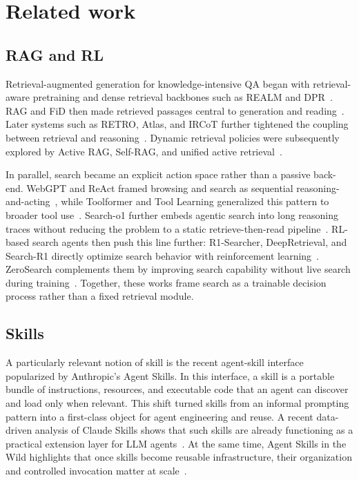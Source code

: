 \documentclass{article}
\begin{document}
\section{Related work}
\subsection{RAG and RL}
Retrieval-augmented generation for knowledge-intensive QA began with retrieval-aware pretraining and dense retrieval backbones such as REALM and DPR~\citep{guu2020realm,karpukhin2020dpr}. RAG and FiD then made retrieved passages central to generation and reading~\citep{lewis2021rag,izacard2021fid}. Later systems such as RETRO, Atlas, and IRCoT further tightened the coupling between retrieval and reasoning~\citep{borgeaud2022retro,izacard2022atlas,trivedi2023ircot}. Dynamic retrieval policies were subsequently explored by Active RAG, Self-RAG, and unified active retrieval~\citep{jiang2023active,asai2023selfrag,cheng2024uar}.

In parallel, search became an explicit action space rather than a passive back-end. WebGPT and ReAct framed browsing and search as sequential reasoning-and-acting~\citep{nakano2022webgpt,yao2023react}, while Toolformer and Tool Learning generalized this pattern to broader tool use~\citep{schick2023toolformer,qin2024toollearning}. Search-o1 further embeds agentic search into long reasoning traces without reducing the problem to a static retrieve-then-read pipeline~\citep{li2025searcho1}. RL-based search agents then push this line further: R1-Searcher, DeepRetrieval, and Search-R1 directly optimize search behavior with reinforcement learning~\citep{song2025r1searcher,jiang2025deepretrieval,jin2025searchr1}. ZeroSearch complements them by improving search capability without live search during training~\citep{sun2025zerosearch}. Together, these works frame search as a trainable decision process rather than a fixed retrieval module.

\subsection{Skills}
A particularly relevant notion of skill is the recent agent-skill interface popularized by Anthropic's Agent Skills. In this interface, a skill is a portable bundle of instructions, resources, and executable code that an agent can discover and load only when relevant. This shift turned skills from an informal prompting pattern into a first-class object for agent engineering and reuse. A recent data-driven analysis of Claude Skills shows that such skills are already functioning as a practical extension layer for LLM agents~\citep{ling2026agentskillsdatadrivenanalysis}. At the same time, Agent Skills in the Wild highlights that once skills become reusable infrastructure, their organization and controlled invocation matter at scale~\citep{liu2026agentskillswildempirical}.
\end{document}
